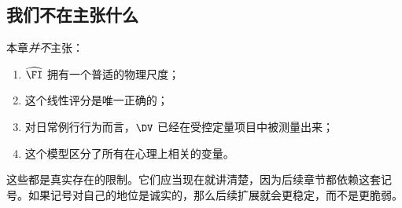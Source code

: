 \subsection{我们不在主张什么}

本章\emph{并不}主张：
\begin{enumerate}[nosep]
  \item $\widehat{\FI}$ 拥有一个普适的物理尺度；
  \item 这个线性评分是唯一正确的；
  \item 对日常例行行为而言，$\DV$ 已经在受控定量项目中被测量出来；
  \item 这个模型区分了所有在心理上相关的变量。
\end{enumerate}

这些都是真实存在的限制。它们应当现在就讲清楚，因为后续章节都依赖这套记号。如果记号对自己的地位是诚实的，那么后续扩展就会更稳定，而不是更脆弱。
